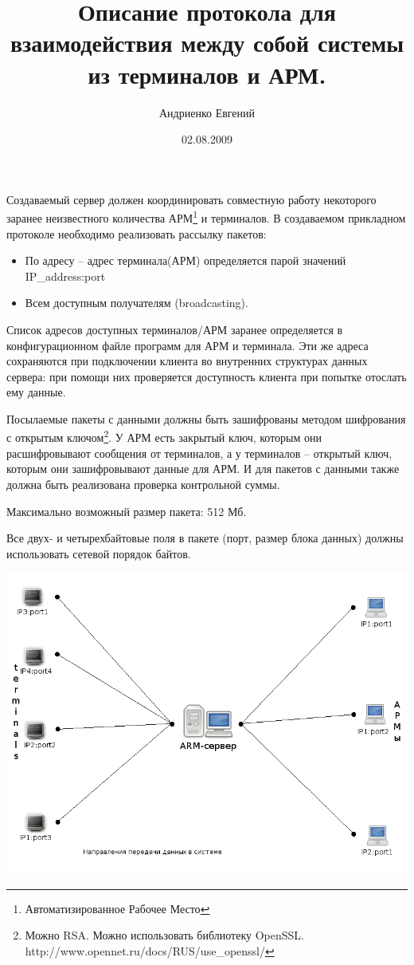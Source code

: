 \documentclass[a4paper,12pt]{report}
\begin{document}
\author{Андриенко Евгений}
\date{02.08.2009}
\title{Описание протокола для взаимодействия между собой системы из терминалов и АРМ.}
\maketitle

Создаваемый сервер должен координировать совместную работу некоторого заранее неизвестного 
количества АРМ\footnote{Автоматизированное Рабочее Место} и терминалов. В создаваемом прикладном 
протоколе необходимо реализовать рассылку пакетов:
\begin{itemize}
\item По адресу -- адрес терминала(АРМ) определяется парой значений IP\_address:port
\item Всем доступным получателям (broadcasting).
\end{itemize}


Список адресов доступных терминалов/АРМ заранее определяется в конфигурационном файле программ для 
АРМ и терминала. Эти же адреса сохраняются при подключении клиента во внутренних структурах данных 
сервера: при помощи них проверяется доступность клиента при попытке отослать ему данные.


Посылаемые пакеты с данными должны быть зашифрованы методом шифрования с открытым ключом\footnote{Можно RSA. Можно использовать библиотеку OpenSSL. http://www.opennet.ru/docs/RUS/use\_openssl/}. У АРМ есть закрытый ключ, которым они расшифровывают сообщения от терминалов, а у терминалов -- 
открытый ключ, которым они зашифровывают данные для АРМ. 
И для пакетов с данными также должна 
быть реализована проверка контрольной суммы.

Максимально возможный размер пакета: 512 Мб.

Все двух- и четырехбайтовые поля в пакете (порт, размер блока данных) должны использовать сетевой 
порядок байтов.

\includegraphics[scale=0.5]{./system_scheme.png}
\end{document}
